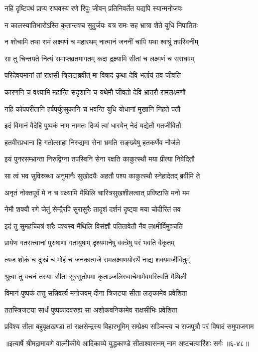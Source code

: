 \twolineshloka
{नहि दृष्टिपथं प्राप्य राघवस्य रणे रिपुः}
{जीवन् प्रतिनिवर्तेत यद्यपि स्यान्मनोजवः} %

\twolineshloka
{न कालस्यातिभारोऽस्ति कृतान्तश्च सुदुर्जयः}
{यत्र रामः सह भ्रात्रा शेते युधि निपातितः} %

\twolineshloka
{न शोचामि तथा रामं लक्ष्मणं च महारथम्}
{नात्मानं जननीं चापि यथा श्वश्रूं तपस्विनीम्} %

\twolineshloka
{सा तु चिन्तयते नित्यं समाप्तव्रतमागतम्}
{कदा द्रक्ष्यामि सीतां च लक्ष्मणं च सराघवम्} %

\twolineshloka
{परिदेवयमानां तां राक्षसी त्रिजटाब्रवीत्}
{मा विषादं कृथा देवि भर्तायं तव जीवति} %

\twolineshloka
{कारणनि च वक्ष्यामि महान्ति सदृशानि च}
{यथेमौ जीवतो देवि भ्रातरौ रामलक्ष्मणौ} %

\twolineshloka
{नहि कोपपरीतानि हर्षपर्युत्सुकानि च}
{भवन्ति युधि योधानां मुखानि निहते पतौ} %

\twolineshloka
{इदं विमानं वैदेहि पुष्पकं नाम नामतः}
{दिव्यं त्वां धारयेन् नेदं यद्येतौ गतजीवितौ} %

\twolineshloka
{हतवीरप्रधाना हि गतोत्साहा निरुद्यमा}
{सेना भ्रमति सङ्ख्येषु हतकर्णेव नौर्जले} %

\twolineshloka
{इयं पुनरसम्भ्रान्ता निरुद्विग्ना तपस्विनि}
{सेना रक्षति काकुत्स्थौ मया प्रीत्या निवेदितौ} %

\twolineshloka
{सा त्वं भव सुविस्रब्धा अनुमानैः सुखोदयैः}
{अहतौ पश्य काकुत्स्थौ स्नेहादेतद् ब्रवीमि ते} %

\twolineshloka
{अनृतं नोक्तपूर्वं मे न च वक्ष्यामि मैथिलि}
{चारित्रसुखशीलत्वात् प्रविष्टासि मनो मम} %

\twolineshloka
{नेमौ शक्यौ रणे जेतुं सेन्द्रैरपि सुरासुरैः}
{तादृशं दर्शनं दृष्ट्वा मया चोदीरितं तव} %

\twolineshloka
{इदं तु सुमहच्चित्रं शरैः पश्यस्व मैथिलि}
{विसंज्ञौ पतितावेतौ नैव लक्ष्मीर्विमुञ्चति} %

\twolineshloka
{प्रायेण गतसत्त्वानां पुरुषाणां गतायुषाम्}
{दृश्यमानेषु वक्त्रेषु परं भवति वैकृतम्} %

\twolineshloka
{त्यज शोकं च दुःखं च मोहं च जनकात्मजे}
{रामलक्ष्मणयोरर्थे नाद्य शक्यमजीवितुम्} %

\twolineshloka
{श्रुत्वा तु वचनं तस्याः सीता सुरसुतोपमा}
{कृताञ्जलिरुवाचेमामेवमस्त्विति मैथिली} %

\twolineshloka
{विमानं पुष्पकं तत्तु सन्निवर्त्य मनोजवम्}
{दीना त्रिजटया सीता लङ्कामेव प्रवेशिता} %

\twolineshloka
{ततस्त्रिजटया सार्धं पुष्पकादवरुह्य सा}
{अशोकवनिकामेव राक्षसीभिः प्रवेशिता} %

\twolineshloka
{प्रविश्य सीता बहुवृक्षखण्डां तां राक्षसेन्द्रस्य विहारभूमिम्}
{सम्प्रेक्ष्य सञ्चिन्त्य च राजपुत्रौ परं विषादं समुपाजगाम} %


॥इत्यार्षे श्रीमद्रामायणे वाल्मीकीये आदिकाव्ये युद्धकाण्डे सीताश्वासनम् नाम अष्टचत्वारिंशः सर्गः ॥६-४८॥
